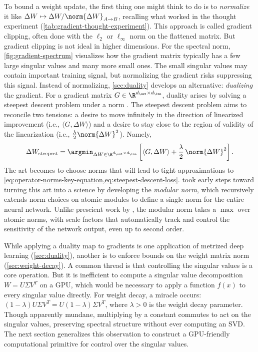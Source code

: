 To bound a weight update, the first thing one might think to do is to \textit{normalize} it like $\Delta W \mapsto \Delta W / \norm{\Delta W}_{A \to B}$, recalling what worked in the thought experiment (\cref{tab:gradient-thought-experiment}). This approach is called gradient clipping, often done with the $\ell_2$ or $\ell_\infty$ norm on the flattened matrix. But gradient clipping is not ideal in higher dimensions. For the spectral norm, \cref{fig:gradient-spectrum} visualizes how the gradient matrix typically has a few large singular values and many more small ones. The small singular values may contain important training signal, but normalizing the gradient risks suppressing this signal. Instead of normalizing, \cref{sec:duality} develops an alternative: \textit{dualizing} the gradient. For a gradient matrix $G \in \R^{d_\out \times d_\inn}$, duality arises by solving a steepest descent problem under a norm \citep{boyd2004convex, bernstein2024anthology}. The steepest descent problem aims to reconcile two tensions: a desire to move infinitely in the direction of linearized improvement (i.e., $\langle G, \Delta W \rangle$) and a desire to stay close to the region of validity of the linearization (i.e., $\tfrac{\lambda}{2} \norm{\Delta W}^2$). Namely, \begin{equation}
    \label{eq:steepest-descent}
    \Delta W_\text{steepest} = \argmin_{\Delta W \in \R^{d_\out \times d_\inn}} \left[\langle G, \Delta W \rangle + \frac{\lambda}{2} \, \norm{\Delta W}^2 \right].
\end{equation} The art becomes to choose norms that will lead to tight approximations to \cref{eq:operator-norms-key-equation,eq:steepest-descent-loss}. \citet{large2024} took early steps toward turning this art into a science by developing the \textit{modular norm}, which recursively extends norm choices on atomic modules to define a single norm for the entire neural network. Unlike prescient work by \citep{flynn2017duality}, the modular norm takes a $\max$ over atomic norms, with scale factors that automatically track and control the sensitivity of the network output, even up to second order.

While applying a duality map to gradients is one application of metrized deep learning (\cref{sec:duality}), another is to enforce bounds on the weight matrix norm (\cref{sec:weight-decay}). A common thread is that controlling the singular values is a core operation. But it is inefficient to compute a singular value decomposition $W = U \Sigma V^T$ on a GPU, which would be necessary to apply a function $f(x)$ to every singular value directly. For weight decay, a miracle occurs: $(1-\lambda) U \Sigma V^T = U (1-\lambda) \Sigma V^T$, where $\lambda > 0$ is the weight decay parameter. Though apparently mundane, multiplying by a constant commutes to act on the singular values, preserving spectral structure without ever computing an SVD. The next section generalizes this observation to construct a GPU-friendly computational primitive for control over the singular values.

